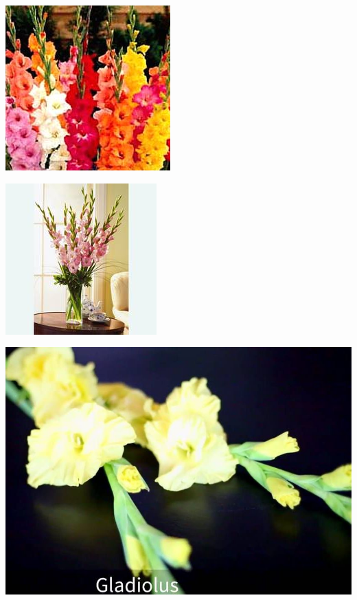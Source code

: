 \documentclass{article}
\begin{document}
\begin{center}
\includegraphics[height=0.925\paperheight]{../Gladiolous.jpg}
\end{center}
\newpage

\begin{center}
\includegraphics[height=0.925\paperheight]{../Gladiolous_Bouquet.jpg}
\end{center}
\newpage

\begin{center}
\includegraphics[height=0.925\paperheight]{../Gladiolus.jpg}
\end{center}
\newpage
\end{document}
